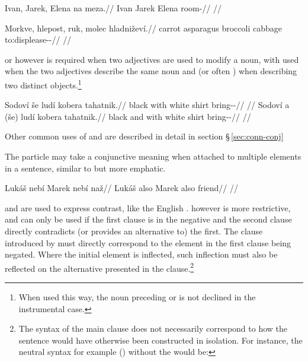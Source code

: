 \pex
\begingl
    \gla Ivan, Jarek, Elena na meza.//
    \glb Ivan Jarek Elena \Loc{} room-\Acc{}//
    \glft {}//
\endgl
\xe

\pex
\begingl
    \gla Morkve, hlepost, ruk, molec hladniževí.//
    \glb carrot asparagus broccoli cabbage to:displease-\Av{}-\Cont{}//
    \glft {}//
\endgl
\xe

 or  however is required when two adjectives are used to modify a noun, with  used when the two adjectives describe the same noun and  (or often ) when describing two distinct objects.\footnote{When used this way, the noun preceding  or  is not declined in the instrumental case.}

\pex
\a
\begingl
    \gla Sodoví {še} ludí kobera tahatnik.//
    \glb black with white shirt bring-\Pv{}-\Pf{}//
    \glft {}//
\endgl
\a
\begingl
    \gla Sodoví {a} {(še)} ludí kobera tahatnik.//
    \glb black and with white shirt bring-\Pv{}-\Pf{}//
    \glft {}//
\endgl
\xe

Other common uses of  and  are described in detail in section \S\,\ref{sec:conn-conj}

The particle  may take a conjunctive meaning when attached to multiple elements in a sentence, similar to  but more emphatic.

\pex
\begingl
    \gla Luk\'aš neb\'i Marek neb\'i naž//
    \glb Luk\'aš also Marek also friend//
    \glft {}//
\endgl
\xe

 and  are used to express contrast, like the English .  however is more restrictive, and can only be used if the first clause is in the negative and the second clause directly contradicts (or provides an alternative to) the first. The clause introduced by  must directly correspond to the element in the first clause being negated. Where the initial element is inflected, such inflection must also be reflected on the alternative presented in the  clause.\footnote{The syntax of the main clause does not necessarily correspond to how the sentence would have otherwise been constructed in isolation. For instance, the neutral syntax for example () without the  would be: }

